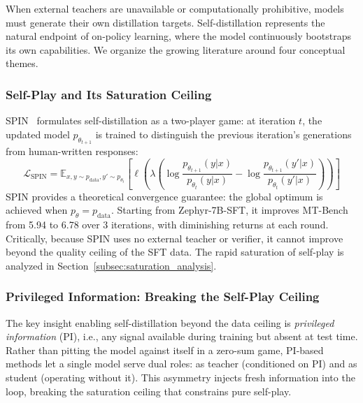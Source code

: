 \documentclass{article} %
\newcommand{\ptheta}{p_\theta}
\begin{document}
When external teachers are unavailable or computationally prohibitive, models must generate their own distillation targets. Self-distillation represents the natural endpoint of on-policy learning, where the model continuously bootstraps its own capabilities. We organize the growing literature around four conceptual themes.

\subsubsection{Self-Play and Its Saturation Ceiling}

SPIN~\citep{2401.01335} formulates self-distillation as a two-player game: at iteration $t$, the updated model $p_{\theta_{t+1}}$ is trained to distinguish the previous iteration's generations from human-written responses:
\begin{equation}
    \mathcal{L}_{\text{SPIN}} = \mathbb{E}_{x, y \sim p_{\text{data}}, y' \sim p_{\theta_t}} \left[ \ell\!\left( \lambda\left(\log \frac{p_{\theta_{t+1}}(y|x)}{p_{\theta_t}(y|x)} - \log \frac{p_{\theta_{t+1}}(y'|x)}{p_{\theta_t}(y'|x)}\right) \right) \right]
\end{equation}
SPIN provides a theoretical convergence guarantee: the global optimum is achieved when $\ptheta = p_{\text{data}}$. Starting from Zephyr-7B-SFT, it improves MT-Bench from 5.94 to 6.78 over 3 iterations, with diminishing returns at each round. Critically, because SPIN uses no external teacher or verifier, it cannot improve beyond the quality ceiling of the SFT data. The rapid saturation of self-play is analyzed in Section~\ref{subsec:saturation_analysis}.

\subsubsection{Privileged Information: Breaking the Self-Play Ceiling}

The key insight enabling self-distillation beyond the data ceiling is \emph{privileged information} (PI), i.e., any signal available during training but absent at test time. Rather than pitting the model against itself in a zero-sum game, PI-based methods let a single model serve dual roles: as teacher (conditioned on PI) and as student (operating without it). This asymmetry injects fresh information into the loop, breaking the saturation ceiling that constrains pure self-play.
\end{document}

